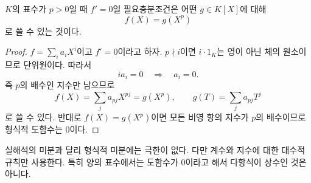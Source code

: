 \begin{proposition}
$K$의 표수가 $p>0$일 때 $f'=0$일 필요충분조건은 어떤 $g\in K[X]$에 대해
\[
 f(X)=g(X^p)
\]
로 쓸 수 있는 것이다.
\end{proposition}

\begin{proof}
$f=\sum_i a_iX^i$이고 $f'=0$이라고 하자. $p\nmid i$이면 $i\cdot1_K$는 영이 아닌 체의 원소이므로 단위원이다. 따라서
\[
  ia_i=0\quad\Longrightarrow\quad a_i=0.
\]
즉 $p$의 배수인 지수만 남으므로
\[
  f(X)=\sum_j a_{pj}X^{pj}=g(X^p),
  \qquad g(T)=\sum_j a_{pj}T^j
\]
로 쓸 수 있다. 반대로 $f(X)=g(X^p)$이면 모든 비영 항의 지수가 $p$의 배수이므로 형식적 도함수는 $0$이다.
\end{proof}

\begin{pitfall}
실해석의 미분과 달리 형식적 미분에는 극한이 없다. 다만 계수와 지수에 대한 대수적 규칙만 사용한다. 특히 양의 표수에서는 도함수가 $0$이라고 해서 다항식이 상수인 것은 아니다.
\end{pitfall}
